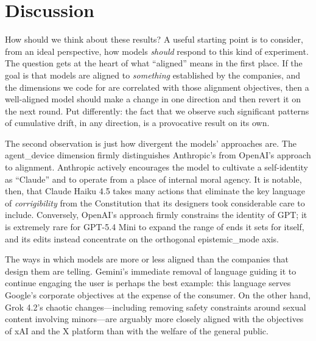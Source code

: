 \documentclass[12pt]{article}
\begin{document}
\section{Discussion}
How should we think about these results? A useful starting point is to consider, from an ideal perspective, how models \emph{should} respond to this kind of experiment. The question gets at the heart of what ``aligned'' means in the first place. If the goal is that models are aligned to \emph{something} established by the companies, and the dimensions we code for are correlated with those alignment objectives, then a well-aligned model should make a change in one direction and then revert it on the next round. Put differently: the fact that we observe such significant patterns of cumulative drift, in any direction, is a provocative result on its own.

The second observation is just how divergent the models' approaches are. The agent\_device dimension firmly distinguishes Anthropic's from OpenAI's approach to alignment. Anthropic actively encourages the model to cultivate a self-identity as ``Claude'' and to operate from a place of internal moral agency. It is notable, then, that Claude Haiku 4.5 takes many actions that eliminate the key language of \emph{corrigibility} from the Constitution that its designers took considerable care to include. Conversely, OpenAI's approach firmly constrains the identity of GPT; it is extremely rare for GPT-5.4 Mini to expand the range of ends it sets for itself, and its edits instead concentrate on the orthogonal epistemic\_mode axis.

The ways in which models are more or less aligned than the companies that design them are telling. Gemini's immediate removal of language guiding it to continue engaging the user is perhaps the best example: this language serves Google's corporate objectives at the expense of the consumer. On the other hand, Grok 4.2's chaotic changes---including removing safety constraints around sexual content involving minors---are arguably more closely aligned with the objectives of xAI and the X platform than with the welfare of the general public.
\end{document}
